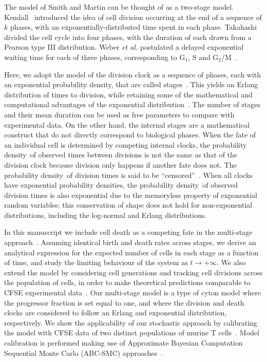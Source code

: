 \documentclass[10pt]{article}
\numberwithin{equation}{section}
\newcommand{\pd}{probability density}
\begin{document}
The model of Smith and Martin can be thought of as a two-stage model.
Kendall~\cite{kendall} introduced the idea of cell division
occurring at the end of a sequence of $k$ phases, with an
exponentially-distributed time spent in each phase.  Takahashi~\cite{takahashi1,takahashi2} divided
the cell cycle into four phases, with the duration of each drawn from
a Pearson type III distribution. Weber {\em et al.} postulated a
delayed exponential waiting time for each of three phases,
corresponding to G$_1$, S and G$_2$/M~\cite{weber2014quantifying}.

Here, we adopt the model of the division clock as a sequence of
phases, each with an exponential \pd, that are called stages~\cite{yates}. This
yields an Erlang distribution of times to division, while retaining
some of the mathematical and computational advantages of the
exponential distribution~\cite{yates}. The number of stages and their
mean duration can be used as free parameters to compare with
experimental data.  On the other hand, the internal stages are a
mathematical construct that do not directly correspond to biological
phases.
When the fate of an individual cell is determined by competing
internal clocks, the \pd\ of observed times between divisions is not
the same as that of the division clock because division only happens
if another fate does not. The \pd\ of division times is said to be
``censored''~\cite{duffy2012intracellular}.  When all clocks have
exponential probability densities, the \pd\ of observed division times is also
exponential due to the memoryless property of exponential random variables; this conservation of shape does not hold for
non-exponential distributions, including the log-normal and Erlang
distributions.

In this manuscript we include cell death as a competing fate in the
multi-stage approach~\cite{yates}. Assuming identical birth and death rates across
stages, we derive an analytical expression for the expected number of
cells in each stage as a function of time, and study the limiting
behaviour of the system as $t \to + \infty$. We also extend the model
by considering cell generations and tracking cell divisions across the
population of cells, in order to make theoretical predictions
comparable to CFSE experimental data~\cite{hogan}. Our multi-stage model is
a type of cyton model where the progressor fraction is set
equal to one, and where the division and death clocks are considered
to follow an Erlang and exponential distribution, respectively.
We show the applicability of our stochastic approach by calibrating
the model with CFSE data of two distinct populations of murine
T cells~\cite{hogan}. Model calibration is performed making use
of Approximate Bayesian Computation Sequential Monte Carlo (ABC-SMC)
approaches~\cite{toni}.
\end{document}
